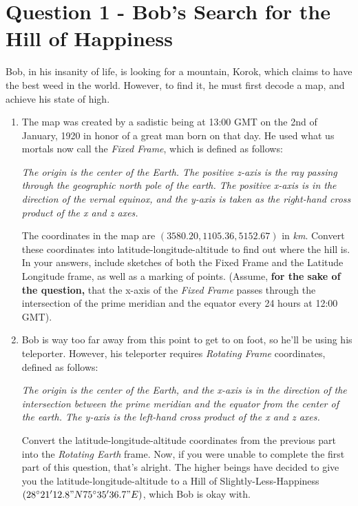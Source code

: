 \documentclass[a4paper, 12pt]{exam}
\begin{document}
	\pagebreak
	
	
	\section*{}
	

	\section*{Question 1 - Bob's Search for the Hill of Happiness}
	Bob, in his insanity of life, is looking for a mountain, Korok, which claims to have the best weed in the world. However, to find it, he must first decode a map, and achieve his state of high.
	
	\begin{enumerate}[label=(\alph*)]
		\item The map was created by a sadistic being at 13:00 GMT on the 2nd of January, 1920 in honor of a great man born on that day. He used what us mortals now call the \textit{Fixed Frame}, which is defined as follows:
		\begin{center}
			\textit{The origin is the center of the Earth. The positive z-axis is the ray passing through the geographic north pole of the earth. The positive x-axis is in the direction of the vernal equinox, and the y-axis is taken as the right-hand cross product of the x and z axes.}
		\end{center}
		The coordinates in the map are $(3580.20,1105.36,5152.67)$ in \textit{km}. Convert these coordinates into latitude-longitude-altitude to find out where the hill is. In your answers, include sketches of both the Fixed Frame and the Latitude Longitude frame, as well as a marking of points. (Assume, \textbf{for the sake of the question,} that the x-axis of the\textit{ Fixed Frame} passes through the intersection of the prime meridian and the equator every 24 hours at 12:00 GMT).
		
		\item Bob is way too far away from this point to get to on foot, so he'll be using his teleporter. However, his teleporter requires \textit{Rotating Frame} coordinates, defined as follows:
		\begin{center}
			\textit{The origin is the center of the Earth, and the x-axis is in the direction of the intersection between the prime meridian and the equator from the center of the earth. The y-axis is the left-hand cross product of the x and z axes.}
		\end{center}
		Convert the latitude-longitude-altitude coordinates from the previous part into the \textit{Rotating Earth} frame. Now, if you were unable to complete the first part of this question, that's alright. The higher beings have decided to give you the latitude-longitude-altitude to a Hill of Slightly-Less-Happiness  $(28\degree21'12.8"N 75\degree35'36.7"E)$, which Bob is okay with. 
		

\end{enumerate}
\end{document}
